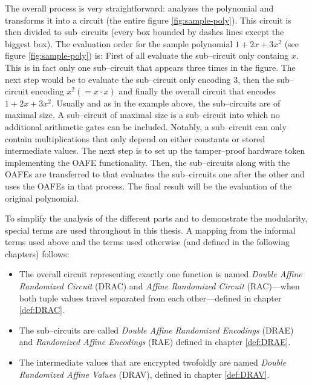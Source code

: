 The overall process is very straightforward: \JWpOne{} analyzes the polynomial
and transforms it into a circuit (the entire figure \ref{fig:sample-poly}). This
circuit is then divided to sub--circuits (every box bounded by dashes lines
except the biggest box). The evaluation order for the sample polynomial $1 + 2x
+ 3x^2$ (see figure \ref{fig:sample-poly}) is: First of all evaluate the
sub--circuit only containg $x$. This is in fact only one sub--circuit that
appears three times in the figure. The next step would be to evaluate the
sub--circuit only encoding $3$, then the sub--circuit encoding $x^2 (= x \cdot
x)$ and finally the overall circuit that encodes $1 + 2x + 3x^2$. Usually and as
in the example above, the sub--circuits are of maximal size. A sub--circuit of
maximal size is a sub--circuit into which no additional arithmetic gates can be
included. Notably, a sub--circuit can only contain multiplications that only
depend on either constants or stored intermediate values. The next step is to
set up the tamper--proof hardware token implementing the OAFE functionality.
Then, the sub--circuits along with the OAFEs are transferred to \JWpTwo{} that
evaluates the sub--circuits one after the other and uses the OAFEs in that
process. The final result will be the evaluation of the original polynomial.

To simplify the analysis of the different parts and to demonstrate the
modularity, special terms are used throughout in this thesis. A mapping from the
informal terms used above and the terms used otherwise (and defined in the
following chapters) follows:


\begin{itemize}

  \item The overall circuit representing exactly one function is named
    \emph{Double Affine Randomized Circuit} (DRAC) and \emph{Affine Randomized
    Circuit} (RAC)---when both tuple values travel separated from each
    other---defined in chapter \ref{def:DRAC}.

  \item The sub--circuits are called \emph{Double Affine Randomized Encodings}
    (DRAE) and \emph{Randomized Affine Encodings} (RAE) defined in chapter
    \ref{def:DRAE}.

  \item The intermediate values that are encrypted twofoldly are named
    \emph{Double Randomized Affine Values} (DRAV), defined in chapter
    \ref{def:DRAV}.

\end{itemize}


